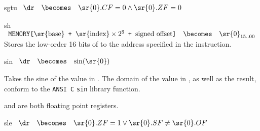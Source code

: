 \begin{instruction}{sgtu}
     {\sgtuopc}
     {
       \begin{math}
         \begin{array}{lcl}
           \dr & \becomes & \sr{0}.CF = 0 \wedge \sr{0}.ZF = 0 \\
         \end{array}
       \end{math}
     }
\end{instruction}


\begin{instruction}{sh}
     {\shopc}
     {
       \begin{math}
         \begin{array}{lcl}
           \texttt{MEMORY[\textrm{\sr{base}} + \(\textrm{\sr{index}}
               \times 2^\texttt{S}\) +  \textrm{signed offset}]}
           & \becomes & {\sr{0}}_{15..00}
         \end{array}
       \end{math}
     }
     {
       Stores the low-order 16 bits of  to the address
       specified in the instruction.
     }
\end{instruction}


\begin{instruction}{sin}
     {\sinopc}
     {
       \begin{math}
         \begin{array}{lcl}
           \dr & \becomes & \sin(\sr{0})
         \end{array}
       \end{math}
     }
     {Takes the sine of the value in .  The domain of the value
     in \texttt{}, as well as the result, conform to
     the \texttt{ANSI C} \texttt{sin} library function.

      and \dr are both floating point registers.}
\end{instruction}


\begin{instruction}{sle}
     {\sleopc}
     {
       \begin{math}
         \begin{array}{lcl}
           \dr & \becomes & \sr{0}.ZF = 1 \vee \sr{0}.SF \neq \sr{0}.OF \\
         \end{array}
       \end{math}
     }
\end{instruction}


